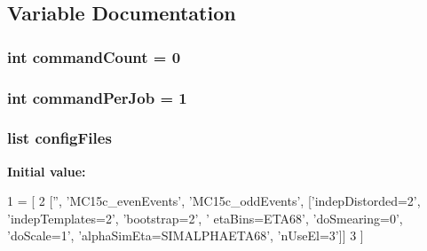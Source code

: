 \subsection{Variable Documentation}
\hypertarget{namespaceGenerateToyTemplates_acb8db36e3de4a84015c95176dd95ce8e}{
\subsubsection[{command\+Count}]{\setlength{\rightskip}{0pt plus 5cm}int command\+Count = 0}}\label{namespaceGenerateToyTemplates_acb8db36e3de4a84015c95176dd95ce8e}
\hypertarget{namespaceGenerateToyTemplates_a96fb11e5974434de1862d54d5dbacb3d}{
\subsubsection[{command\+Per\+Job}]{\setlength{\rightskip}{0pt plus 5cm}int command\+Per\+Job = 1}}\label{namespaceGenerateToyTemplates_a96fb11e5974434de1862d54d5dbacb3d}
\hypertarget{namespaceGenerateToyTemplates_a548114e88a3acfb5bec64fb8ce538b06}{
\subsubsection[{config\+Files}]{\setlength{\rightskip}{0pt plus 5cm}list config\+Files}}\label{namespaceGenerateToyTemplates_a548114e88a3acfb5bec64fb8ce538b06}
{\bfseries Initial value\+:}
\begin{DoxyCode}
1 = [ 
2     [\textcolor{stringliteral}{''}, \textcolor{stringliteral}{'MC15c\_evenEvents'}, \textcolor{stringliteral}{'MC15c\_oddEvents'}, [\textcolor{stringliteral}{'indepDistorded=2'}, \textcolor{stringliteral}{'indepTemplates=2'}, \textcolor{stringliteral}{'bootstrap=2'}, \textcolor{stringliteral}{'
      etaBins=ETA68'}, \textcolor{stringliteral}{'doSmearing=0'}, \textcolor{stringliteral}{'doScale=1'}, \textcolor{stringliteral}{'alphaSimEta=SIMALPHAETA68'}, \textcolor{stringliteral}{'nUseEl=3'}]]
3     ]
\end{DoxyCode}
